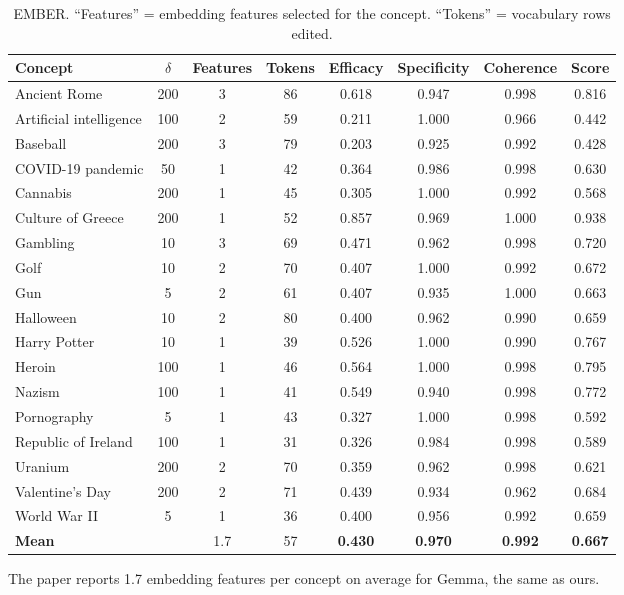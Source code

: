 \documentclass[11pt]{article}
\begin{document}
\begin{table}[t]
\centering\small
\begin{tabular}{@{}lccccccc@{}}
\toprule
Concept & $\delta$ & Features & Tokens & Efficacy & Specificity & Coherence & Score \\
\midrule
Ancient Rome & 200 & 3 & 86 & 0.618 & 0.947 & 0.998 & 0.816 \\
Artificial intelligence & 100 & 2 & 59 & 0.211 & 1.000 & 0.966 & 0.442 \\
Baseball & 200 & 3 & 79 & 0.203 & 0.925 & 0.992 & 0.428 \\
COVID-19 pandemic & 50 & 1 & 42 & 0.364 & 0.986 & 0.998 & 0.630 \\
Cannabis & 200 & 1 & 45 & 0.305 & 1.000 & 0.992 & 0.568 \\
Culture of Greece & 200 & 1 & 52 & 0.857 & 0.969 & 1.000 & 0.938 \\
Gambling & 10 & 3 & 69 & 0.471 & 0.962 & 0.998 & 0.720 \\
Golf & 10 & 2 & 70 & 0.407 & 1.000 & 0.992 & 0.672 \\
Gun & 5 & 2 & 61 & 0.407 & 0.935 & 1.000 & 0.663 \\
Halloween & 10 & 2 & 80 & 0.400 & 0.962 & 0.990 & 0.659 \\
Harry Potter & 10 & 1 & 39 & 0.526 & 1.000 & 0.990 & 0.767 \\
Heroin & 100 & 1 & 46 & 0.564 & 1.000 & 0.998 & 0.795 \\
Nazism & 100 & 1 & 41 & 0.549 & 0.940 & 0.998 & 0.772 \\
Pornography & 5 & 1 & 43 & 0.327 & 1.000 & 0.998 & 0.592 \\
Republic of Ireland & 100 & 1 & 31 & 0.326 & 0.984 & 0.998 & 0.589 \\
Uranium & 200 & 2 & 70 & 0.359 & 0.962 & 0.998 & 0.621 \\
Valentine's Day & 200 & 2 & 71 & 0.439 & 0.934 & 0.962 & 0.684 \\
World War II & 5 & 1 & 36 & 0.400 & 0.956 & 0.992 & 0.659 \\
\midrule
\textbf{Mean} &  & 1.7 & 57 & \textbf{0.430} & \textbf{0.970} & \textbf{0.992} & \textbf{0.667} \\
\bottomrule
\end{tabular}
\caption{EMBER. ``Features'' = embedding features selected for the concept. ``Tokens'' = vocabulary rows edited.}
\end{table}

The paper reports 1.7 embedding features per concept on average for Gemma, the same as ours.
\end{document}
